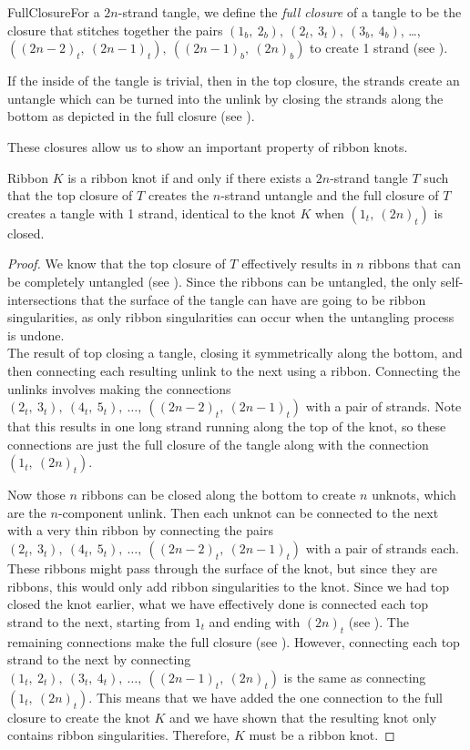 \begin{paper}
\begin{paperdef}{FullClosure}{For a $2n$-strand tangle, we define the
\textit{full closure} of a tangle to be the closure that stitches together the
pairs $(1_b,~2_b),~(2_t,~3_t),~(3_b,~4_b)$, \dots,
$((2n-2)_t,~(2n-1)_t),~((2n-1)_b,~(2n)_b)$ to create 1 strand (see
\figFull).}\end{paperdef}

If the inside of the tangle is trivial, then in the top closure, the strands
create an untangle which can be turned into the unlink by closing the strands
along the bottom as depicted in the full closure (see \figFull).

These closures allow us to show an important property of ribbon knots.

\begin{paperthm}{Ribbon}
$K$ is a ribbon knot if and only if there exists a $2n$-strand tangle $T$ such
that the top closure of $T$ creates the $n$-strand untangle and the full closure
of $T$ creates a tangle with 1 strand, identical to the knot $K$ when
$(1_t,~(2n)_t)$ is closed.
\end{paperthm}
\begin{proof}
We know that the top closure of $T$ effectively results in $n$ ribbons that can
be completely untangled (see \figTop).
Since the ribbons can be untangled, the only self-intersections that the surface
of the tangle can have are going to be ribbon singularities, as only ribbon
singularities can occur when the untangling process is undone.\\

{The result of top closing a tangle, closing it symmetrically
along the bottom, and then connecting each resulting unlink to the next using a
ribbon.
Connecting the unlinks involves making the connections
$(2_t,~3_t),~(4_t,~5_t),~\dots,~((2n-2)_t,~(2n-1)_t)$ with a pair of strands.
Note that this results in one long strand running along the top of the knot, so
these connections are just the full closure of the tangle along with the
connection $(1_t,~(2n)_t)$.}

Now those $n$ ribbons can be closed along the bottom to create $n$ unknots,
which are the $n$-component unlink.
Then each unknot can be connected to the next with a very thin ribbon by
connecting the pairs $(2_t,~3_t),~(4_t,~5_t),~\dots,~((2n-2)_t,~(2n-1)_t)$ with
a pair of strands each.
These ribbons might pass through the surface of the knot, but since they are
ribbons, this would only add ribbon singularities to the knot.
Since we had top closed the knot earlier, what we have effectively done is
connected each top strand to the next, starting from $1_t$ and ending with
$(2n)_t$ (see \figProof).
The remaining connections make the full closure (see \figFull).
However, connecting each top strand to the next by connecting
$(1_t,~2_t),~(3_t,~4_t),~\dots,~((2n-1)_t,~(2n)_t)$ is the same as connecting
$(1_t,~(2n)_t)$.
This means that we have added the one connection to the full closure to create
the knot $K$ and we have shown that the resulting knot only contains ribbon
singularities.
Therefore, $K$ must be a ribbon knot.


\end{proof}
\end{paper}
